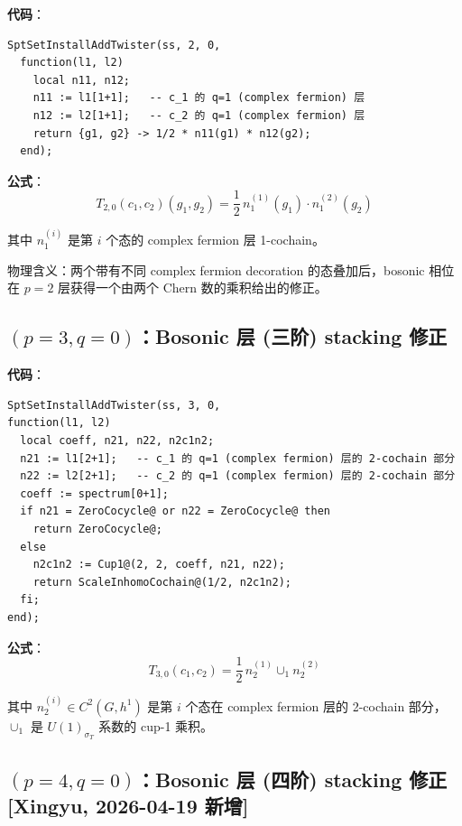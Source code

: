 \documentclass[a4paper,fontset=ubuntu,12pt]{ctexart}
\newcommand{\aT}{\sigma_T}
\begin{document}
\textbf{代码}：
\begin{lstlisting}
SptSetInstallAddTwister(ss, 2, 0,
  function(l1, l2)
    local n11, n12;
    n11 := l1[1+1];   -- c_1 的 q=1 (complex fermion) 层
    n12 := l2[1+1];   -- c_2 的 q=1 (complex fermion) 层
    return {g1, g2} -> 1/2 * n11(g1) * n12(g2);
  end);
\end{lstlisting}

\textbf{公式}：
\begin{equation}
\label{eq:twister-20}
\boxed{T_{2,0}(c_1, c_2)(g_1, g_2) = \frac{1}{2}\, n_1^{(1)}(g_1) \cdot n_1^{(2)}(g_2)}
\end{equation}

其中 $n_1^{(i)}$ 是第 $i$ 个态的 complex fermion 层 1-cochain。

物理含义：两个带有不同 complex fermion decoration 的态叠加后，bosonic 相位在 $p = 2$ 层获得一个由两个 Chern 数的乘积给出的修正。

\subsection{$(p = 3, q = 0)$：Bosonic 层 (三阶) stacking 修正}

\textbf{代码}：
\begin{lstlisting}
SptSetInstallAddTwister(ss, 3, 0,
function(l1, l2)
  local coeff, n21, n22, n2c1n2;
  n21 := l1[2+1];   -- c_1 的 q=1 (complex fermion) 层的 2-cochain 部分
  n22 := l2[2+1];   -- c_2 的 q=1 (complex fermion) 层的 2-cochain 部分
  coeff := spectrum[0+1];
  if n21 = ZeroCocycle@ or n22 = ZeroCocycle@ then
    return ZeroCocycle@;
  else
    n2c1n2 := Cup1@(2, 2, coeff, n21, n22);
    return ScaleInhomoCochain@(1/2, n2c1n2);
  fi;
end);
\end{lstlisting}

\textbf{公式}：
\begin{equation}
\label{eq:twister-30}
\boxed{T_{3,0}(c_1, c_2) = \frac{1}{2}\, n_2^{(1)} \cup_1 n_2^{(2)}}
\end{equation}

其中 $n_2^{(i)} \in C^2(G, h^1)$ 是第 $i$ 个态在 complex fermion 层的 2-cochain 部分，
$\cup_1$ 是 $U(1)_{\aT}$ 系数的 cup-1 乘积。

\subsection{$(p = 4, q = 0)$：Bosonic 层 (四阶) stacking 修正 \textmd{[Xingyu, 2026-04-19 新增]}}
\label{sec:twister-40}
\end{document}

